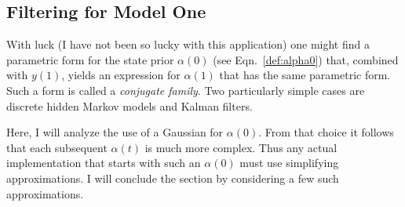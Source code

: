 \documentclass[12pt]{article}
\newcommand{\ti}[2]{{#1}{(#2)}}                         %
\begin{document}
\subsection{Filtering for Model One}
\label{sec:filter2}

With luck (I have not been so lucky with this application) one might
find a parametric form for the state prior $\alpha(0)$ (see
Eqn.~\eqref{def:alpha0}) that, combined with $\ti{y}{1}$, yields an
expression for $\alpha(1)$ that has the same parametric form.  Such a
form is called a \emph{conjugate family}.  Two particularly simple
cases are discrete hidden Markov models and Kalman filters.

Here, I will analyze the use of a Gaussian for $\alpha(0)$.  From that
choice it follows that each subsequent $\ti{\alpha}{t}$ is much more
complex.  Thus any actual implementation that starts with such an
$\alpha(0)$ must use simplifying approximations.  I will conclude the
section by considering a few such approximations.
\end{document}
